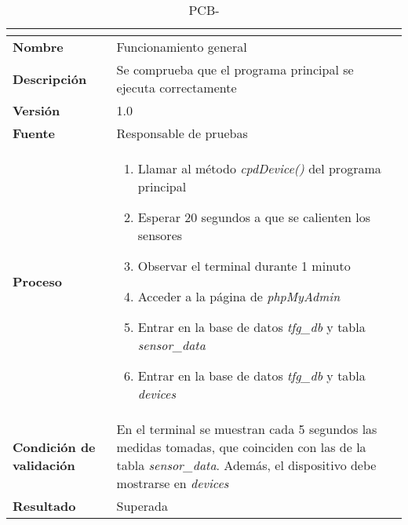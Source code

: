 \begin{table}[H]
	\caption{PCB-\number\pcb}
	\begin{tabular}{|l|p{}|}
		\hline
		\multicolumn{2}{|c|}{\cellcolor[HTML]{BFBFBF}{\color[HTML]{000000} \textbf{PCB-\number\pcb}}} \\ \hline
		\textbf{Nombre}                  & Funcionamiento general                                                                                                                                                             \\ \hline
		\textbf{Descripción}             & Se comprueba que el programa principal se ejecuta correctamente                                                                                                                    \\ \hline
		\textbf{Versión}                 & 1.0                                                                                                                                                                                \\ \hline
		\textbf{Fuente}                  & Responsable de pruebas                                                                                                                                                             \\ \hline
		\textbf{Proceso}                 & \begin{enumerate}
			\item Llamar al método \textit{cpdDevice()} del programa principal
			\item Esperar 20 segundos a que se calienten los sensores
			\item Observar el terminal durante 1 minuto
			\item Acceder a la página de \textit{phpMyAdmin}
			\item Entrar en la base de datos \textit{tfg\_db} y tabla \textit{sensor\_data}
			\item Entrar en la base de datos \textit{tfg\_db} y tabla \textit{devices}
		\end{enumerate}                                                                                                                                                         \\ \hline
		\textbf{Condición de validación} & En el terminal se muestran cada 5 segundos las medidas tomadas, que coinciden con las de la tabla \textit{sensor\_data}. Además, el dispositivo debe mostrarse en \textit{devices} \\ \hline
		\textbf{Resultado}               & Superada                                                                                                                                                                           \\ \hline
	\end{tabular}
\end{table}
\vspace{-1cm}

